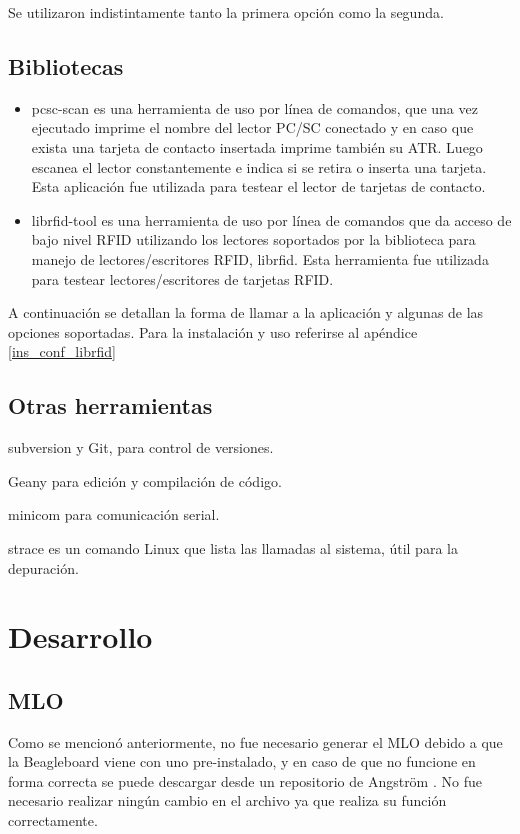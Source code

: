 \bigskip
Se utilizaron indistintamente tanto la primera opción como la segunda.

\subsection{Bibliotecas}

\begin{itemize}
\item pcsc-scan es una herramienta de uso por línea de comandos, que una vez ejecutado imprime el nombre del lector PC/SC conectado y en caso que exista una tarjeta de contacto insertada imprime también su ATR. Luego  escanea el lector constantemente e indica si se retira o inserta una tarjeta. Esta aplicación fue utilizada para testear el lector de tarjetas de contacto.
\item  librfid-tool es una herramienta de uso por línea de comandos que da acceso de bajo nivel RFID utilizando los lectores soportados por la biblioteca para manejo de lectores/escritores RFID, librfid. Esta herramienta fue utilizada para testear lectores/escritores de tarjetas RFID.
\end{itemize}

A continuación se detallan la forma de llamar a la aplicación y algunas de las opciones soportadas. Para la instalación y uso referirse al apéndice \ref{ins_conf_librfid}

\subsection{Otras herramientas}
subversion y Git, para control de versiones. 

Geany para edición y compilación de código.

minicom para comunicación serial.

strace es un comando Linux que lista las llamadas al sistema, útil para la depuración.

\section{Desarrollo}

\subsection{MLO}
Como se mencionó anteriormente, no fue necesario generar el MLO debido a que la Beagleboard viene con uno pre-instalado, y en caso de que no funcione en forma correcta se puede descargar desde un repositorio de Angström \cite{Angs_MLO}. No fue necesario realizar ningún cambio en el archivo ya que realiza su función correctamente.

